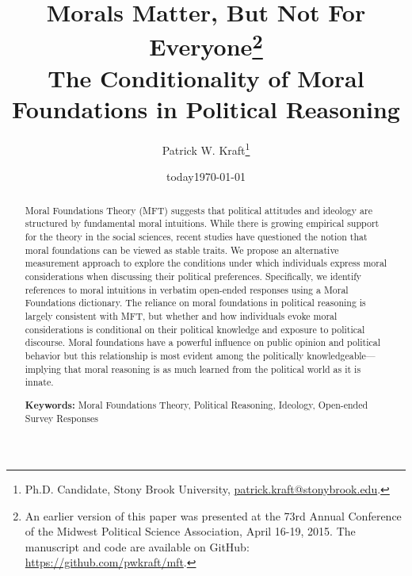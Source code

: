 \documentclass[12pt]{article}
\author{Patrick W. Kraft\footnote{Ph.D. Candidate, Stony Brook University, \href{mailto:patrick.kraft@stonybrook.edu}{patrick.kraft@stonybrook.edu}.
}}
\date{today}
\title{Morals Matter, But Not For Everyone\footnote{An earlier version of this paper was presented at the 73rd Annual Conference of the Midwest Political Science Association, April 16-19, 2015. The manuscript and code are available on GitHub: \url{https://github.com/pwkraft/mft}.}\\
\large{The Conditionality of Moral Foundations in Political Reasoning}}
\date{\today}
\begin{document}
\maketitle
\doublespacing

\begin{abstract}\singlespacing
Moral Foundations Theory (MFT) suggests that political attitudes and ideology are structured by fundamental moral intuitions. While there is growing empirical support for the theory in the social sciences, recent studies have questioned the notion that moral foundations can be viewed as stable traits. We propose an alternative measurement approach to explore the conditions under which individuals express moral considerations when discussing their political preferences. Specifically, we identify references to moral intuitions in verbatim open-ended responses using a Moral Foundations dictionary. The reliance on moral foundations in political reasoning is largely consistent with MFT, but whether and how individuals evoke moral considerations is conditional on their political knowledge and exposure to political discourse. Moral foundations have a powerful influence on public opinion and political behavior but this relationship is most evident among the politically knowledgeable---implying that moral reasoning is as much learned from the political world as it is innate.

\vspace{\baselineskip}
\noindent \textbf{Keywords:} Moral Foundations Theory, Political Reasoning, Ideology, Open-ended Survey Responses
\end{abstract}
\newpage

\end{document}
